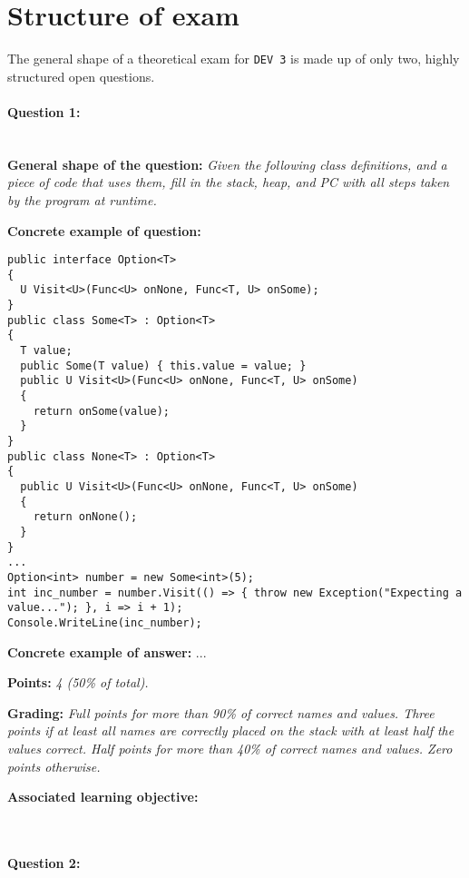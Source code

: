 \section*{Structure of exam \modulecode}
The general shape of a theoretical exam for \texttt{DEV 3} is made up of only two, highly structured open questions.

\paragraph{Question 1: } \ \\

\textbf{General shape of the question:} \textit{Given the following class definitions, and a piece of code that uses them, fill in the stack, heap, and PC with all steps taken by the program at runtime.}

\textbf{Concrete example of question:}

\lstset{numbers=left,basicstyle=\ttfamily\small}\lstset{language=[Sharp]C}
\begin{lstlisting}
public interface Option<T>
{
  U Visit<U>(Func<U> onNone, Func<T, U> onSome);
}
public class Some<T> : Option<T>
{
  T value;
  public Some(T value) { this.value = value; }
  public U Visit<U>(Func<U> onNone, Func<T, U> onSome)
  {
    return onSome(value);
  }
}
public class None<T> : Option<T>
{
  public U Visit<U>(Func<U> onNone, Func<T, U> onSome)
  {
    return onNone();
  }
}
...
Option<int> number = new Some<int>(5);
int inc_number = number.Visit(() => { throw new Exception("Expecting a value..."); }, i => i + 1);
Console.WriteLine(inc_number);
\end{lstlisting}

\textbf{Concrete example of answer:}
...

\textbf{Points:} \textit{4 (50\% of total).}

\textbf{Grading:} \textit{Full points for more than 90\% of correct names and values. Three points if at least all names are correctly placed on the stack with at least half the values correct. Half points for more than 40\% of correct names and values. Zero points otherwise.}

\textbf{Associated learning objective:} 

\ \\ 

\paragraph{Question 2: } \ \\

